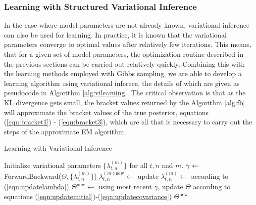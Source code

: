 \documentclass{amsart}
\begin{document}
\subsubsection{Learning with Structured Variational Inference}

In the case where model parameters are not already known, variational  
inference can also be used for learning.  In practice, it is known that 
the variational parameters converge to optimal values after relatively 
few iterations.  This means, that for a given set of model parameters, 
the optimization routine described in the previous sections can be 
carried out relatively quickly.  Combining this with the learning 
methods employed with Gibbs sampling, we are able to develop a learning 
algorithm using variational inferece, the details of which are given as 
pseudocode in Algorithm \ref{alg:vilearning}. The critical observation 
is that as the KL divergence gets small, the bracket values returned by 
the Algorithm \ref{alg:fb} will approximate the bracket values of the 
true posterior, equations (\ref{eqn:bracket1}) - 
(\ref{eqn:bracket3}), which are all that is necessary to carry out the steps of the approximate EM 
algorithm. 

\begin{algorithm}
  \caption{Learning with Variational Inference\label{alg:vilearning}}
  \begin{algorithmic}[1]
	\State Initialize variational parameters $\{\lambda_{t,n}^{(m)}\}$ 
	for all $t,n$ and $m$.
	\hfill{}
	\State ${\tt \gamma}\leftarrow ${\sc ForwardBackward($\Theta,\{\lambda_{t,n}^{(m)}\}$)}
	\State $\lambda_{t,n}^{(m)\text{new}}\leftarrow $ update 
	$\lambda_{t,n}^{(m)}\leftarrow $ according 
	to (\ref{eqn:updatelambda})
	\EndFor
	\EndFor
	\EndFor
	\EndFor
	\State $\Theta^\text{new}\leftarrow$ using most recent $\gamma$, update $\Theta$ according to 
	equations (\ref{eqn:updateinitial})-(\ref{eqn:updatecovariance})
	\EndFor
    \State\Return ${\Theta^\text{new}}$
    \EndFunction
  \end{algorithmic}
\end{algorithm}




\end{document}
